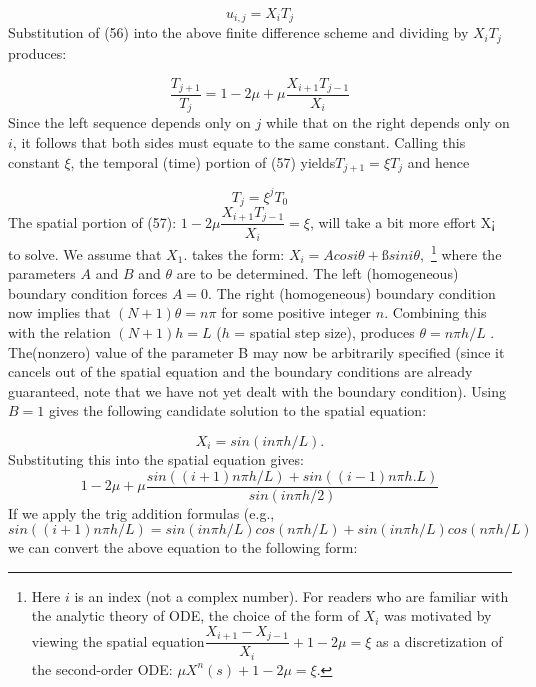 \documentclass[../main.tex]{subfiles}
\begin{document}
\begin{equation}\label{eqa56}
u_{i,j}=X_iT_j
\end{equation}
Substitution of (56) into the above finite difference scheme and dividing by $X_iT_j$ produces: 

\begin{equation}\label{eqa57}
\dfrac{T_{j+1}}{T_j}=1-2\mu+\mu \dfrac{X_{i+1}T_{j-1}}{X_i}
\end{equation}
Since the left sequence depends only on $j$ while that on the right depends only on $i$, it follows that both sides must equate to the same constant. Calling this constant $\xi$, the temporal (time) portion of (57) yields$T_{j+1} = \xi T_j$ and hence

\begin{equation}\label{eqa58}
T_j = \xi^jT_0
\end{equation}
The spatial portion of (57): $1-2 \mu \dfrac{X_{i+1}T_{j-1}}{X_i}=\xi$, will take a bit more effort 
X¡ 
to solve. We assume that $X_1$. takes the form: $X_i = Acosi\theta + ßsin i\theta,$
\footnote{Here $i$ is an index (not a complex number). For readers who are familiar with the analytic theory of ODE, the choice of the form of $X_i$ was motivated by viewing the spatial equation$\dfrac{X_{i+1} - X_{j-1}}{X_i}  + 1-2\mu = \xi$ as a discretization of the second-order ODE: $\mu X^n (s) +1 -2 \mu = \xi$.}
where the parameters $A$ and $B$ and $\theta$ are to be determined. The left (homogeneous) boundary condition forces $A = 0$. The right (homogeneous) boundary condition now implies that $(N +1)\theta = n\pi$ for some positive integer $n$. Combining this with the relation $(N + 1)h = L$ ($h$  = spatial step size), produces $\theta = n\pi h/L$ . The(nonzero) value of the parameter B may now be arbitrarily specified (since it cancels out of the spatial equation and the boundary conditions are already guaranteed, note that we have not yet dealt with the boundary condition). Using $B = 1$ gives the following candidate solution to the spatial equation: 

\begin{equation}\label{eqa59}
X_i=sin(in\pi h/L).
\end{equation}
Substituting this into the spatial equation gives: 
$$1-2\mu+\mu \dfrac{sin((i+1)n \pi h/L) + sin((i-1)n\pi h.L)}{sin(in\pi h/2)}$$
If we apply the trig addition formulas (e.g.,  $sin((i+1)n \pi h/L)= sin(in \pi h/L)cos(n\pi h/L) +sin(in \pi h/L)cos(n\pi h/L)$ we can convert the above equation to the following form: 
\end{document}
